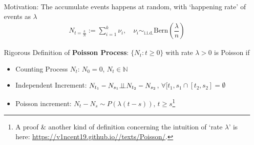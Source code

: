 Motivation: The accumulate events happens at random, with `happening rate' of events as $ \lambda  $
\begin{align}
    N_{t=\frac{k}{N}}:= \sum_{i=1}^k \nu  _i,\quad \nu  _i\sim_{\mathrm{i.i.d.} } \mathrm{Bern}(\dfrac{\lambda }{n}) 
\end{align}

Rigorous Definition of \textbf{Poisson Process}: $ \{N_t:t\geq 0\} $ with rate $ \lambda >0 $ is Poisson if 
\begin{itemize}[topsep=2pt,itemsep=0pt]
    \item Counting Process $ N_t $: $ N_0=0 $, $ N_t\in\mathbb{N} $
    \item Independent Increment: $ N_{t_1}-N_{s_1}\bot\!\!\!\bot N_{t_2}-N_{s_2} $, $ \forall [t_1,s_1\cap [t_2,s_2]=\emptyset $
    \item Poisson increment: $ N_t-N_s\sim P\left(\lambda (t-s)\right) $, $ t\geq s $\footnote{A proof \& another kind of definition concerning the intuition of `rate $ \lambda  $' is here: \url{https://v1ncent19.github.io//texts/Poisson/}.}
\end{itemize}

